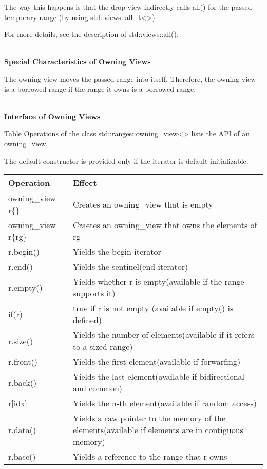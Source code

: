 The way this happens is that the drop view indirectly calls all() for the passed temporary range (by using std::views::all\_t<>).

For more details, see the description of std::views::all().


\noindent
\hspace*{\fill} \\ %
\textbf{Special Characteristics of Owning Views}

The owning view moves the passed range into itself. Therefore, the owning view is a borrowed range if the range it owns is a borrowed range.

\noindent
\hspace*{\fill} \\ %
\textbf{Interface of Owning Views}

Table Operations of the class std::ranges::owning\_view<> lists the API of an owning\_view.

The default constructor is provided only if the iterator is default initializable.

\begin{longtable}[c]{|l|l|}
	\hline
	\textbf{Operation}   & \textbf{Effect}                                                \\ \hline
	\endfirsthead
	\endhead
	owning\_view r\{\}   & Creates an owning\_view that is empty                          \\ \hline
	owning\_view r\{rg\} & Craetes an owning\_view that owns the elements of rg           \\ \hline
	r.begin()            & Yields the begin iterator                                      \\ \hline
	r.end()              & Yields the sentinel(end iterator)                              \\ \hline
	r.empty()            & Yields whether r is empty(available if the range supports it)  \\ \hline
	if(r)                & true if r is not empty (available if empty() is defined)       \\ \hline
	r.size() & Yields the number of elements(available if it refers to a sized range)                             \\ \hline
	r.front()            & Yields the first element(available if forwarfing)              \\ \hline
	r.back()             & Yields the last element(available if bidirectional and common) \\ \hline
	r{[}idx{]}           & Yields the n-th element(available if random access)            \\ \hline
	r.data() & Yields a raw pointer to the memory of the elements(available if elements are in contiguous memory) \\ \hline
	r.base()             & Yields a reference to the range that r owns                    \\ \hline
\end{longtable}

